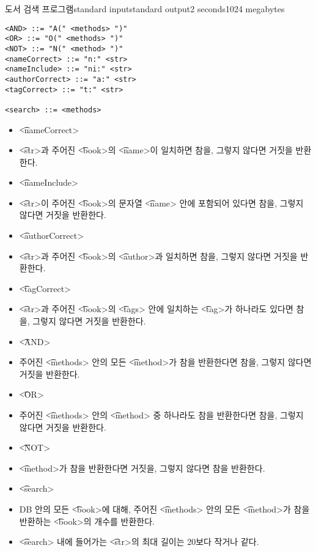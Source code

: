 \begin{problem}{도서 검색 프로그램}{standard input}{standard output}{2 seconds}{1024 megabytes}
\begin{lstlisting}
<AND> ::= "A(" <methods> ")"
<OR> ::= "O(" <methods> ")"
<NOT> ::= "N(" <method> ")"
<nameCorrect> ::= "n:" <str>
<nameInclude> ::= "ni:" <str>
<authorCorrect> ::= "a:" <str>
<tagCorrect> ::= "t:" <str>

<search> ::= <methods>
\end{lstlisting}

\begin{itemize}
  \item \t{<nameCorrect>}
    \item \t{<str>}과 주어진 \t{<book>}의 \t{<name>}이 일치하면 참을, 그렇지 않다면 거짓을 반환한다.

  \item \t{<nameInclude>}
    \item \t{<str>}이 주어진 \t{<book>}의 문자열 \t{<name>} 안에 포함되어 있다면 참을, 그렇지 않다면 거짓을 반환한다.

  \item \t{<authorCorrect>}
    \item \t{<str>}과 주어진 \t{<book>}의 \t{<author>}과 일치하면 참을, 그렇지 않다면 거짓을 반환한다.

  \item \t{<tagCorrect>}
    \item \t{<str>}과 주어진 \t{<book>}의 \t{<tags>} 안에 일치하는 \t{<tag>}가 하나라도 있다면 참을, 그렇지 않다면 거짓을 반환한다.

  \item \t{<AND>}
    \item 주어진 \t{<methods>} 안의 모든 \t{<method>}가 참을 반환한다면 참을, 그렇지 않다면 거짓을 반환한다.

  \item \t{<OR>}
    \item 주어진 \t{<methods>} 안의 \t{<method>} 중 하나라도 참을 반환한다면 참을, 그렇지 않다면 거짓을 반환한다.

  \item \t{<NOT>}
    \item \t{<method>}가 참을 반환한다면 거짓을, 그렇지 않다면 참을 반환한다.

  \item \t{<search>}
    \item DB 안의 모든 \t{<book>}에 대해, 주어진 \t{<methods>} 안의 모든 \t{<method>}가 참을 반환하는 \t{<book>}의 개수를 반환한다.

  \item \t{<search>} 내에 들어가는 \t{<str>}의 최대 길이는 20보다 작거나 같다.
\end{itemize}


\end{problem}

